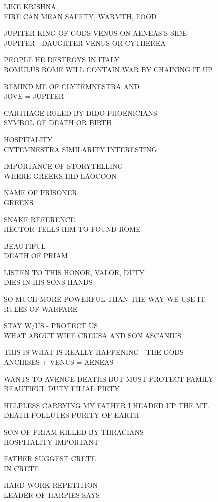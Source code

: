 \documentclass[10pt,letterpaper]{article}
\begin{document}
LIKE KRISHNA\\
FIRE CAN MEAN SAFETY, WARMTH, FOOD

JUPITER KING OF GODS VENUS ON AENEAS'S SIDE\\
JUPITER {-} DAUGHTER VENUS OR CYTHEREA

PEOPLE HE DESTROYS IN ITALY\\
ROMULUS ROME WILL CONTAIN WAR BY CHAINING IT UP

REMIND ME OF CLYTEMNESTRA AND\\
JOVE = JUPITER

CARTHAGE RULED BY DIDO PHOENICIANS\\
SYMBOL OF DEATH OR BIRTH

HOSPITALITY\\
CYTEMNESTRA SIMILARITY INTERESTING

IMPORTANCE OF STORYTELLING\\
WHERE GREEKS HID LAOCOON

NAME OF PRISONER\\
GREEKS

SNAKE REFERENCE\\
HECTOR TELLS HIM TO FOUND ROME

BEAUTIFUL\\
DEATH OF PRIAM

LISTEN TO THIS HONOR, VALOR, DUTY\\
DIES IN HIS SONS HANDS

SO MUCH MORE POWERFUL THAN THE WAY WE USE IT\\
RULES OF WARFARE

STAY W/US {-} PROTECT US\\
WHAT ABOUT WIFE CREUSA AND SON ASCANIUS

THIS IS WHAT IS REALLY HAPPENING {-} THE GODS\\
ANCHISES + VENUS = AENEAS

WANTS TO AVENGE DEATHS BUT MUST PROTECT FAMILY\\
BEAUTIFUL DUTY FILIAL PIETY

HELPLESS CARRYING MY FATHER I HEADED UP THE MT.\\
DEATH POLLUTES PURITY OF EARTH

SON OF PRIAM KILLED BY THRACIANS\\
HOSPITALITY IMPORTANT

FATHER SUGGEST CRETE\\
IN CRETE

HARD WORK REPETITION\\
LEADER OF HARPIES SAYS
\end{document}
